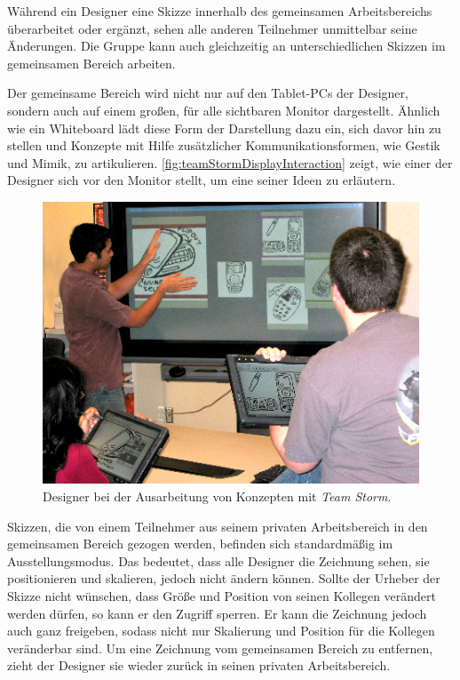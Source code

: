 Während ein Designer eine Skizze innerhalb des gemeinsamen Arbeitsbereichs überarbeitet oder ergänzt, sehen alle anderen Teilnehmer unmittelbar seine Änderungen. Die Gruppe kann auch gleichzeitig an unterschiedlichen Skizzen im gemeinsamen Bereich arbeiten.

Der gemeinsame Bereich wird nicht nur auf den Tablet-PCs der Designer, sondern auch auf einem großen, für alle sichtbaren Monitor dargestellt. Ähnlich wie ein Whiteboard lädt diese Form der Darstellung dazu ein, sich davor hin zu stellen und Konzepte mit Hilfe zusätzlicher Kommunikationsformen, wie Gestik und Mimik, zu artikulieren. \autoref{fig:teamStormDisplayInteraction} zeigt, wie einer der Designer sich vor den Monitor stellt, um eine seiner Ideen zu erläutern.

\begin{figure}[bth]
	\includegraphics[width=\linewidth]{gfx/teamStormDisplayInteraction.png}
	\caption[Ausarbeitung von Konzepten \newline \citep{Hailpern:2007p113}]{Designer bei der Ausarbeitung von Konzepten mit \emph{Team Storm}.}
	\label{fig:teamStormDisplayInteraction}
\end{figure}

Skizzen, die von einem Teilnehmer aus seinem privaten Arbeitsbereich in den gemeinsamen Bereich gezogen werden, befinden sich standardmäßig im Ausstellungsmodus. Das bedeutet, dass alle Designer die Zeichnung sehen, sie positionieren und skalieren, jedoch nicht ändern können. Sollte der Urheber der Skizze nicht wünschen, dass Größe und Position von seinen Kollegen verändert werden dürfen, so kann er den Zugriff sperren. Er kann die Zeichnung jedoch auch ganz freigeben, sodass nicht nur Skalierung und Position für die Kollegen veränderbar sind. Um eine Zeichnung vom gemeinsamen Bereich zu entfernen, zieht der Designer sie wieder zurück in seinen privaten Arbeitsbereich.

